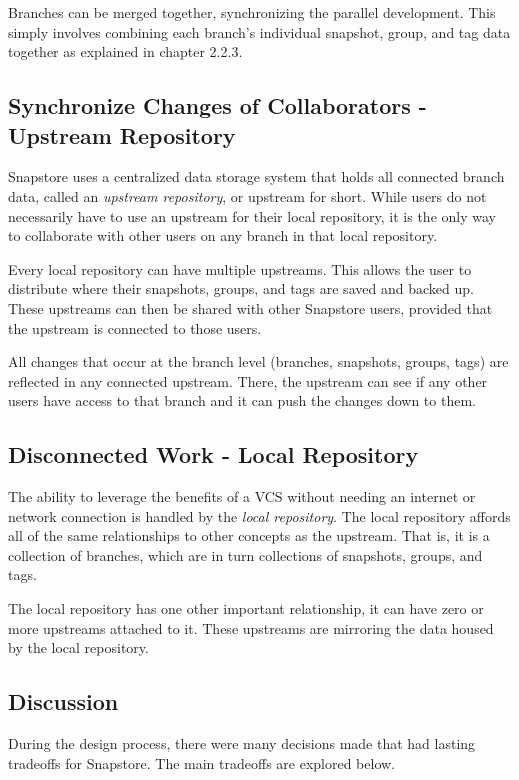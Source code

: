 Branches can be merged together, synchronizing the parallel development. This simply involves combining each branch's individual snapshot, group, and tag data together as explained in chapter 2.2.3.

\subsection{Synchronize Changes of Collaborators - Upstream Repository}

Snapstore uses a centralized data storage system that holds all connected branch data, called an \textit{upstream repository}, or upstream for short. While users do not necessarily have to use an upstream for their local repository, it is the only way to collaborate with other users on any branch in that local repository.

Every local repository can have multiple upstreams. This allows the user to distribute where their snapshots, groups, and tags are saved and backed up. These upstreams can then be shared with other Snapstore users, provided that the upstream is connected to those users. 

All changes that occur at the branch level (branches, snapshots, groups, tags) are reflected in any connected upstream. There, the upstream can see if any other users have access to that branch and it can push the changes down to them.

\subsection{Disconnected Work - Local Repository}

The ability to leverage the benefits of a VCS without needing an internet or network connection is handled by the \textit{local repository}. The local repository affords all of the same relationships to other concepts as the upstream. That is, it is a collection of branches, which are in turn collections of snapshots, groups, and tags.

The local repository has one other important relationship, it can have zero or more upstreams attached to it. These upstreams are mirroring the data housed by the local repository.

\subsection{Discussion}

During the design process, there were many decisions made that had lasting tradeoffs for Snapstore. The main tradeoffs are explored below.

